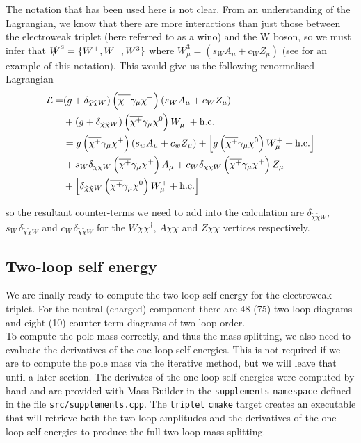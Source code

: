 \documentclass[11pt]{article}
\newcommand{\mychi}{\raisebox{0pt}[1ex][1ex]{$\chi$}}
\newcommand{\mb}{\textsf{Mass Builder} }
\begin{document}
The notation that has been used here is not clear.  From an understanding of the Lagrangian, we know that there are more interactions than just those between the electroweak triplet (here referred to as a wino) and the W boson, so we must infer that $ \slashed{W}^a = \{W^+,W^-,W^3\}$ where $W_{\mu}^3 = (s_W A_{\mu}+c_W Z_{\mu})$ (see \cite{Ostdiek2015} for an example of this notation).  This would give us the following renormalised Lagrangian
\begin{align}
\begin{split}
\mathcal{L}=
&(g+\delta_{\tilde{\chi} \tilde{\chi} W})\left(\overline{\mychi^+}\gamma_{\mu}\mychi^+\right)\left(s_WA_{\mu}+c_WZ_{\mu}\right)\\
&+(g+\delta_{\tilde{\chi} \tilde{\chi} W})\left(\overline{\mychi^+}\gamma_{\mu}\mychi^0 \right)W_{\mu}^++\text{h.c.}\\
&=g\left(\overline{\mychi^+}\gamma_{\mu}\mychi^+\right)\left(s_wA_{\mu}+c_wZ_{\mu}\right)+\left[g\left(\overline{\mychi^+}\gamma_{\mu}\mychi^0 \right)W_{\mu}^++\text{h.c.}\right]\\
&+s_W\delta_{\tilde{\chi} \tilde{\chi} W}\left(\overline{\mychi^+}\gamma_{\mu}\mychi^+\right)A_{\mu}+c_W\delta_{\tilde{\chi} \tilde{\chi} W}\left(\overline{\mychi^+}\gamma_{\mu}\mychi^+\right)Z_{\mu}\\
&+\left[\delta_{\tilde{\chi} \tilde{\chi} W}\left(\overline{\mychi^+}\gamma_{\mu}\mychi^0 \right)W_{\mu}^++\text{h.c.}\right]\\
\end{split}
\end{align}

so the resultant counter-terms we need to add into the calculation are $\delta_{\tilde{\chi} \tilde{\chi} W}$, $s_W\,\delta_{\tilde{\chi} \tilde{\chi} W}$ and $c_W\,\delta_{\tilde{\chi} \tilde{\chi} W}$ for the $W\chi\chi^{\dagger}$, $A\chi\chi$ and $Z\chi\chi$ vertices respectively.
\newpage
\subsection{Two-loop self energy}

We are finally ready to compute the two-loop self energy for the electroweak triplet.  For the neutral (charged) component there are 48 (75) two-loop diagrams and eight (10) counter-term diagrams of two-loop order.\\

To compute the pole mass correctly, and thus the mass splitting, we also need to evaluate the derivatives of the one-loop self energies.  This is not required if we are to compute the pole mass via the iterative method, but we will leave that until a later section.  The derivates of the one loop self energies were computed by hand and are provided with \mb in the \lstinline{supplements} \lstinline{namespace} defined in the file \lstinline{src/supplements.cpp}.  The \lstinline{triplet} \lstinline{cmake} target creates an executable that will retrieve both the two-loop amplitudes and the derivatives of the one-loop self energies to produce the full two-loop mass splitting.\\
\end{document}
